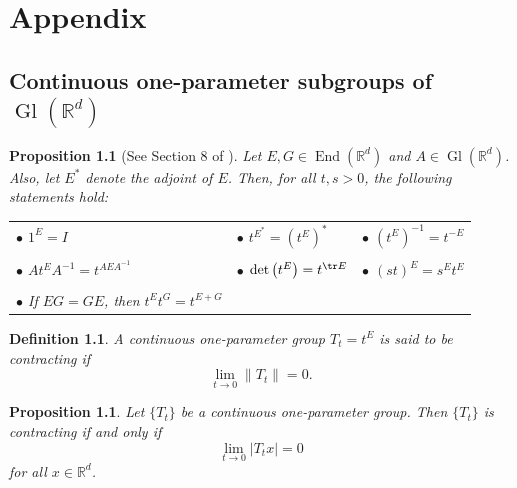 \documentclass[11pt, letter]{book}
\newtheorem{definition}[theorem]{Definition}
\newtheorem{proposition}[theorem]{Proposition}
\newcommand\End{\operatorname{End}} %
\newcommand\Gl{\operatorname{Gl}} %
\renewcommand\det{\operatorname{det}}
\begin{document}



\chapter{Appendix}\label{chap:Appendix}



\section{Continuous one-parameter subgroups of $\Gl(\mathbb{R}^d)$}\label{sec:OneParameterGroups}

\begin{proposition}[See Section 8 of \cite{randles_convolution_2017}]\label{prop:ContinuousGroupProperties}
Let $E,G\in\End(\mathbb{R}^d)$ and $A\in\Gl(\mathbb{R}^d)$. Also, let $E^*$ denote the adjoint of $E$. Then, for all $t,s>0$, the following statements hold:

\vspace{.3cm}
\begin{tabular}{lll}
$\bullet$ $1^E=I$ &  $\bullet$ $t^{E^*}=(t^E)^*$ & $\bullet$ $(t^E)^{-1}=t^{-E}$ 
\\
\vspace{.1cm}\\
$\bullet$ $At^EA^{-1}=t^{AEA^{-1}}$ &  $\bullet$ $\det\left(t^E\right)=t^{\tr E}$ & $\bullet$ $(st)^E=s^Et^E$\\
\vspace{.1cm}\\
$\bullet$ If $EG=GE$, then $t^Et^G=t^{E+G}$ &&
\end{tabular}
\end{proposition}

\begin{definition} A continuous one-parameter group $T_t=t^E$ is said to be \textit{contracting} if
\begin{equation*}
\lim_{t\to 0}\|T_t\|=0. 
\end{equation*}
\end{definition}

\begin{proposition}
Let $\{T_t\}$ be a continuous one-parameter group. Then $\{T_t\}$ is contracting if and only if
\begin{equation}\label{eq:ContractingSufficient}
\lim_{t\to 0}|T_tx|=0
\end{equation}
for all $x\in\mathbb{R}^d$.
\end{proposition}
\end{document}
